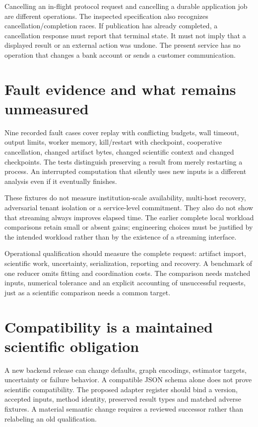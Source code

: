 Cancelling an in-flight protocol request and cancelling a durable application
job are different operations. The inspected specification also recognizes
cancellation/completion races.\cite{v12_mcp_legacy_cancellation} If publication
has already completed, a cancellation response must report that terminal state.
It must not imply that a displayed result or an external action was undone.
The present service has no operation that changes a bank account or sends a
customer communication.

\section{Fault evidence and what remains unmeasured}

Nine recorded fault cases cover replay with conflicting budgets, wall timeout,
output limits, worker memory, kill/restart with checkpoint, cooperative
cancellation, changed artifact bytes, changed scientific context and changed
checkpoints.\cite{v12_in_runtime} The tests distinguish preserving a result from
merely restarting a process. An interrupted computation that silently uses new
inputs is a different analysis even if it eventually finishes.

These fixtures do not measure institution-scale availability, multi-host
recovery, adversarial tenant isolation or a service-level commitment. They also
do not show that streaming always improves elapsed time. The earlier complete
local workload comparisons retain small or absent gains; engineering choices
must be justified by the intended workload rather than by the existence of a
streaming interface.

Operational qualification should measure the complete request: artifact import,
scientific work, uncertainty, serialization, reporting and recovery. A benchmark
of one reducer omits fitting and coordination costs. The comparison needs
matched inputs, numerical tolerance and an explicit accounting of unsuccessful
requests, just as a scientific comparison needs a common target.

\section{Compatibility is a maintained scientific obligation}

A new backend release can change defaults, graph encodings, estimator targets,
uncertainty or failure behavior. A compatible JSON schema alone does not prove
scientific compatibility. The proposed adapter register should bind a version,
accepted inputs, method identity, preserved result types and matched adverse
fixtures. A material semantic change requires a reviewed successor rather than
relabeling an old qualification.

